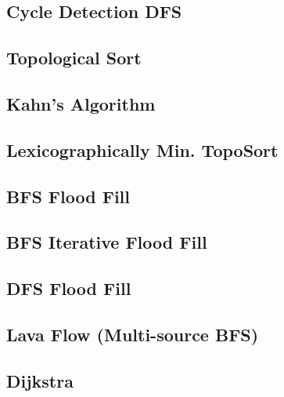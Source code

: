 \documentclass[10pt]{article}
\begin{document}
\begin{multicols*}{2}
\subsection{Cycle Detection DFS}


\subsection{Topological Sort}


\subsection{Kahn's Algorithm}


\subsection{Lexicographically Min. TopoSort}


\subsection{BFS Flood Fill}


\subsection{BFS Iterative Flood Fill}


\subsection{DFS Flood Fill}


\subsection{Lava Flow (Multi-source BFS)}


\subsection{Dijkstra}



\end{multicols*}
\end{document}
